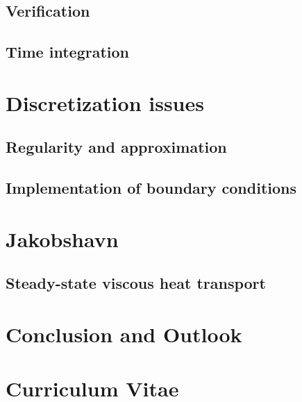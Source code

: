 \documentclass[a4paper,twoside,11pt,pdftex]{report}
\begin{document}
\section{Verification}\label{sec:verification}


\section{Time integration}\label{sec:timestep}


\cleardoublepage
\chapter{Discretization issues}\label{chap:discretization}

\section{Regularity and approximation}\label{sec:regularity}


\section{Implementation of boundary conditions}\label{sec:slip}


\cleardoublepage
% 

\chapter{Jakobshavn}\label{chap:jakobshavn}


\section{Steady-state viscous heat transport}\label{sec:vht}


\cleardoublepage

\chapter{Conclusion and Outlook}\label{chap:outlook}

\cleardoublepage



\cleardoublepage

\appendix

\pagestyle{plain}
\chapter*{Curriculum Vitae}
\end{document}
